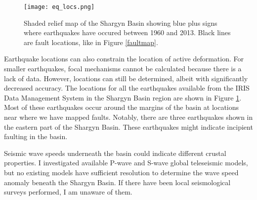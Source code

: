 \begin{figure}[h!]
  \centering
  \texttt{[image: eq\_locs.png]}
  \caption{Shaded relief map of the Shargyn Basin showing blue plus signs where earthquakes have occured between 1960 and 2013. Black lines are fault locations, like in Figure \ref{faultmap}.}
  \label{eqlocs}
\end{figure}	
	Earthquake locations can also constrain the location of active deformation. For smaller earthquakes, focal mechanisms cannot be calculated because there is a lack of data. However, locations can still be determined, albeit with significantly decreased accuracy. The locations for all the earthquakes available from the IRIS Data Management System in the Shargyn Basin region are shown in Figure \ref{eqlocs}. Most of these earthquakes occur around the margins of the basin at locations near where we have mapped faults. Notably, there are three earthquakes shown in the eastern part of the Shargyn Basin. These earthquakes might indicate incipient faulting in the basin.

	Seismic wave speeds underneath the basin could indicate different crustal properties. I investigated available P-wave and S-wave global teleseismic models, but no existing models have sufficient resolution to determine the wave speed anomaly beneath the Shargyn Basin. If there have been local seismological surveys performed, I am unaware of them. 


